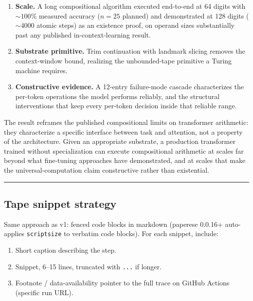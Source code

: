 \documentclass[twocolumn,switch,10pt]{article}
\providecommand{\tightlist}{\setlength{\itemsep}{0pt}\setlength{\parskip}{0pt}}
\begin{document}
\begin{enumerate}
\def\labelenumi{\arabic{enumi}.}
\tightlist
\item
  \textbf{Scale.} A long compositional algorithm executed end-to-end at
  64 digits with \(\sim 100\%\) measured accuracy (\(n = 25\) planned)
  and demonstrated at 128 digits (\(\sim 4000\) atomic steps) as an
  existence proof, on operand sizes substantially past any published
  in-context-learning result.
\item
  \textbf{Substrate primitive.} Trim continuation with landmark slicing
  removes the context-window bound, realizing the
  unbounded-tape primitive a Turing machine requires.
\item
  \textbf{Constructive evidence.} A 12-entry failure-mode cascade
  characterizes the per-token operations the model performs
  reliably, and the structural interventions that keep every
  per-token decision inside that reliable range.
\end{enumerate}

The result reframes the published compositional limits on
transformer arithmetic: they characterize a specific interface
between task and attention, not a property of the architecture.
Given an appropriate substrate, a production transformer trained
without specialization can execute compositional arithmetic at
scales far beyond what fine-tuning approaches have demonstrated,
and at scales that make the universal-computation claim
constructive rather than existential.

\begin{center}\rule{0.5\linewidth}{0.5pt}\end{center}

\subsection{Tape snippet strategy}\label{tape-snippet-strategy}

Same approach as v1: fenced code blocks in markdown (paperese 0.0.16+
auto-applies \texttt{scriptsize} to verbatim code blocks). For each snippet,
include:

\begin{enumerate}
\def\labelenumi{\arabic{enumi}.}
\tightlist
\item
  Short caption describing the step.
\item
  Snippet, 6--15 lines, truncated with \texttt{...} if longer.
\item
  Footnote / data-availability pointer to the full trace on GitHub
  Actions (specific run URL).
\end{enumerate}
\end{document}
